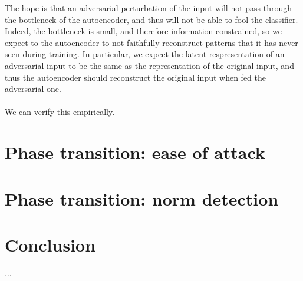 \documentclass[]{scrarticle}
\begin{document}
The hope is that an adversarial perturbation of the input
will not pass through the bottleneck of the autoencoder,
and thus will not be able to fool the classifier.
Indeed, the bottleneck is small, and therefore information
constrained, so we expect to the autoencoder to
not faithfully reconstruct patterns that it has never seen
during training. In particular, we expect the latent respresentation
of an adversarial input to be the same as the representation of
the original input, and thus the autoencoder should reconstruct the
original input when fed the adversarial one.

\paragraph{} We can verify this empirically.


\section{Phase transition: ease of attack}

\section{Phase transition: norm detection}


\section*{Conclusion}

...

\newpage
\nocite{*}


\end{document}
